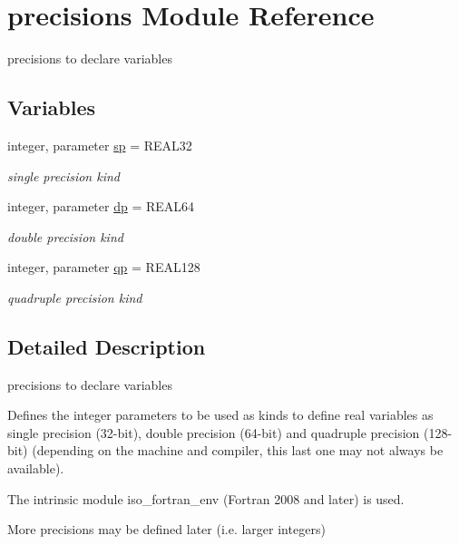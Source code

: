 \hypertarget{namespaceprecisions}{}\section{precisions Module Reference}
\label{namespaceprecisions}


precisions to declare variables  


\subsection*{Variables}
\begin{DoxyCompactItemize}
\item 
integer, parameter \hyperlink{namespaceprecisions_a82ad0ad3a64dfde3aab0a00aff168e0d}{sp} = R\+E\+A\+L32
\begin{DoxyCompactList}\small\item\em single precision kind \end{DoxyCompactList}\item 
integer, parameter \hyperlink{namespaceprecisions_a70c0046430d95734ae5df77254ce2897}{dp} = R\+E\+A\+L64
\begin{DoxyCompactList}\small\item\em double precision kind \end{DoxyCompactList}\item 
integer, parameter \hyperlink{namespaceprecisions_a3ab2fa4401db1cceb93ec85a83aa4a90}{qp} = R\+E\+A\+L128
\begin{DoxyCompactList}\small\item\em quadruple precision kind \end{DoxyCompactList}\end{DoxyCompactItemize}


\subsection{Detailed Description}
precisions to declare variables 

Defines the integer parameters to be used as kinds to define real variables as single precision (32-\/bit), double precision (64-\/bit) and quadruple precision (128-\/bit) (depending on the machine and compiler, this last one may not always be available).

The intrinsic module \textquotesingle{}iso\+\_\+fortran\+\_\+env\textquotesingle{} (Fortran 2008 and later) is used.

More precisions may be defined later (i.\+e. larger integers)


